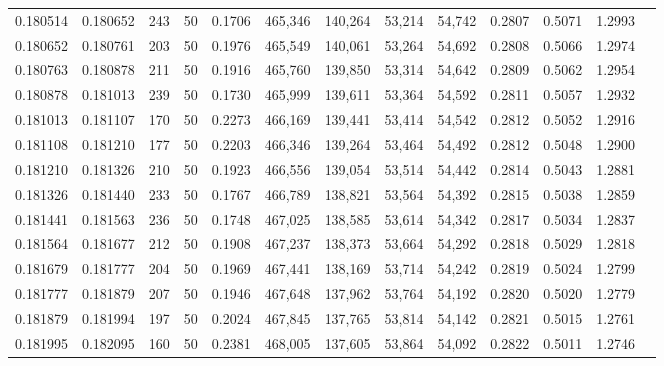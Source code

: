 \begin{tabular}{rrrrrrrrrrrrr}
0.180514 & 0.180652 &   243 &  50 &                                     0.1706 & 465,346 & 140,264 &  53,214 &  54,742 & 0.2807 & 0.5071 & 1.2993 \\
0.180652 & 0.180761 &   203 &  50 &                                     0.1976 & 465,549 & 140,061 &  53,264 &  54,692 & 0.2808 & 0.5066 & 1.2974 \\
0.180763 & 0.180878 &   211 &  50 &                                     0.1916 & 465,760 & 139,850 &  53,314 &  54,642 & 0.2809 & 0.5062 & 1.2954 \\
0.180878 & 0.181013 &   239 &  50 &                                     0.1730 & 465,999 & 139,611 &  53,364 &  54,592 & 0.2811 & 0.5057 & 1.2932 \\
0.181013 & 0.181107 &   170 &  50 &                                     0.2273 & 466,169 & 139,441 &  53,414 &  54,542 & 0.2812 & 0.5052 & 1.2916 \\
0.181108 & 0.181210 &   177 &  50 &                                     0.2203 & 466,346 & 139,264 &  53,464 &  54,492 & 0.2812 & 0.5048 & 1.2900 \\
0.181210 & 0.181326 &   210 &  50 &                                     0.1923 & 466,556 & 139,054 &  53,514 &  54,442 & 0.2814 & 0.5043 & 1.2881 \\
0.181326 & 0.181440 &   233 &  50 &                                     0.1767 & 466,789 & 138,821 &  53,564 &  54,392 & 0.2815 & 0.5038 & 1.2859 \\
0.181441 & 0.181563 &   236 &  50 &                                     0.1748 & 467,025 & 138,585 &  53,614 &  54,342 & 0.2817 & 0.5034 & 1.2837 \\
0.181564 & 0.181677 &   212 &  50 &                                     0.1908 & 467,237 & 138,373 &  53,664 &  54,292 & 0.2818 & 0.5029 & 1.2818 \\
0.181679 & 0.181777 &   204 &  50 &                                     0.1969 & 467,441 & 138,169 &  53,714 &  54,242 & 0.2819 & 0.5024 & 1.2799 \\
0.181777 & 0.181879 &   207 &  50 &                                     0.1946 & 467,648 & 137,962 &  53,764 &  54,192 & 0.2820 & 0.5020 & 1.2779 \\
0.181879 & 0.181994 &   197 &  50 &                                     0.2024 & 467,845 & 137,765 &  53,814 &  54,142 & 0.2821 & 0.5015 & 1.2761 \\
0.181995 & 0.182095 &   160 &  50 &                                     0.2381 & 468,005 & 137,605 &  53,864 &  54,092 & 0.2822 & 0.5011 & 1.2746 \\

\end{tabular}
